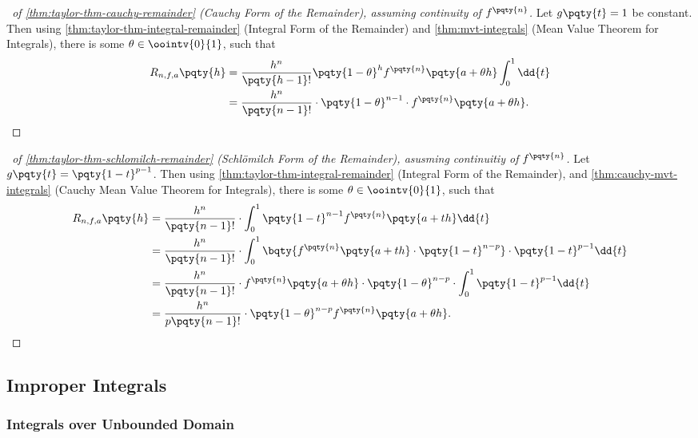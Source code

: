 \begin{proof}[\proofname\ of \autoref{thm:taylor-thm-cauchy-remainder} (Cauchy Form of the Remainder), assuming continuity of \(f^{\pqty{n}}\)]
    Let \(g\pqty{t} = 1\) be constant. Then using \autoref{thm:taylor-thm-integral-remainder} (Integral Form of the Remainder) and \autoref{thm:mvt-integrals} (Mean Value Theorem for Integrals), there is some \(\theta \in \oointv{0}{1}\), such that
    \begin{align*}
        R_{n, f, a} \pqty{h} &= \frac{h^n}{\pqty{h - 1}!} \pqty{1 - \theta}^{h} f^{\pqty{n}} \pqty{a + \theta h} \int_{0}^{1} \dd{t} \\
        &= \frac{h^n}{\pqty{n - 1}!} \cdot \pqty{1 - \theta}^{n - 1} \cdot f^{\pqty{n}} \pqty{a + \theta h}.
    \end{align*}
\end{proof}

\begin{proof}[\proofname\ of \autoref{thm:taylor-thm-schlomilch-remainder} (Schl\"{o}milch Form of the Remainder), asusming continuitiy of \(f^{\pqty{n}}\)]
    Let \(g\pqty{t} = \pqty{1 - t}^{p - 1}\). Then using \autoref{thm:taylor-thm-integral-remainder} (Integral Form of the Remainder), and \autoref{thm:cauchy-mvt-integrals} (Cauchy Mean Value Theorem for Integrals), there is some \(\theta \in \oointv{0}{1}\), such that
    \begin{align*}
        R_{n, f, a} \pqty{h} &= \frac{h^n}{\pqty{n - 1}!} \cdot \int_{0}^{1} \pqty{1 - t}^{n - 1} f^{\pqty{n}} \pqty{a + th} \dd{t} \\
        &= \frac{h^n}{\pqty{n - 1}!} \cdot \int_{0}^{1} \bqty{f^{\pqty{n}} \pqty{a + th} \cdot \pqty{1 - t}^{n - p}} \cdot \pqty{1 - t}^{p - 1} \dd{t} \\
        &= \frac{h^n}{\pqty{n - 1}!} \cdot f^{\pqty{n}} \pqty{a + \theta h} \cdot \pqty{1 - \theta}^{n - p} \cdot \int_{0}^{1} \pqty{1 - t}^{p - 1} \dd{t} \\
        &= \frac{h^n}{p \pqty{n - 1}!} \cdot \pqty{1 - \theta}^{n - p} f^{\pqty{n}} \pqty{a + \theta h}.
    \end{align*}
\end{proof}

\subsection{Improper Integrals}

\subsubsection{Integrals over Unbounded Domain}

